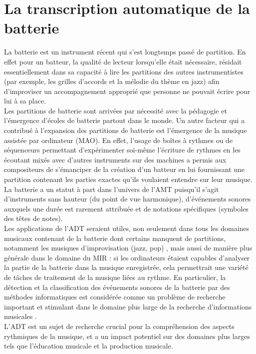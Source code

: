 \section{La transcription automatique de la batterie}
La batterie est un instrument récent qui s’est longtemps passé de partition. En
effet pour un batteur, la qualité de lecteur lorsqu’elle était nécessaire,
résidait essentiellement dans sa capacité à lire les partitions des autres
instrumentistes (par exemple, les grilles d’accords et la mélodie du thème en
jazz) afin d’improviser un accompagnement approprié que personne ne pouvait
écrire pour lui à sa place.\\
Les partitions de batterie sont arrivées par nécessité avec la pédagogie et
l’émergence d’écoles de batterie partout dans le monde. Un autre facteur qui a
contribué à l’expansion des partitions de batterie est l’émergence de la
musique assistée par ordinateur (MAO). En effet, l’usage de boîtes à rythmes ou
de séquenceurs permettant d’expérimenter soi-même l’écriture de rythmes en les
écoutant mixés avec d’autres instruments sur des machines a permis  aux
compositeurs de s’émanciper de la création d’un batteur en lui fournissant une
partition contenant les parties exactes qu’ils voulaient entendre sur leur
musique.\\
La batterie a un statut à part dans l’univers de l’AMT puisqu'il s'agit
d'instruments sans hauteur (du point de vue harmonique), d'événements sonores
auxquels une durée est rarement attribuée et de notations spécifiques (symboles
des têtes de notes).\\
Les applications de l’ADT seraient utiles, non seulement dans tous les domaines
musicaux contenant de la batterie dont certains manquent de partitions,
notamment les musiques d’improvisation (jazz, pop) \cite{future_directions},
mais aussi de manière plus générale dans le domaine du MIR : si les ordinateurs
étaient capables d'analyser la partie de la batterie dans la musique
enregistrée, cela permettrait une variété de tâches de traitement de la musique
liées au rythme. En particulier, la détection et la classification des
événements sonores de la batterie par des méthodes informatiques est considérée
comme un problème de recherche important et stimulant dans le domaine plus
large de la recherche d'informations musicales \cite{Review_ADT}.\\
L'ADT est un sujet de recherche crucial pour la compréhension des aspects
rythmiques de la musique, et a un impact potentiel sur des domaines plus larges
tels que l'éducation musicale et la production musicale.


